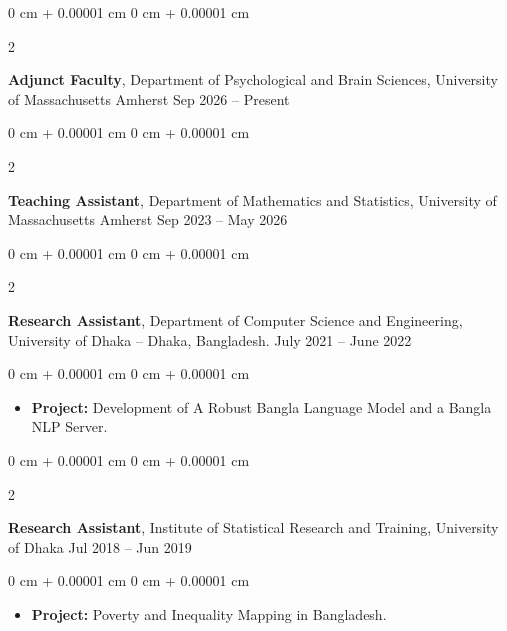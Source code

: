 \documentclass[10pt, letterpaper]{article}
\newenvironment{highlights}{
    \begin{itemize}[
        topsep=0.10 cm,
        parsep=0.10 cm,
        partopsep=0pt,
        itemsep=0pt,
        leftmargin=0 cm + 10pt
    ]
}{
    \end{itemize}
} %
\newenvironment{onecolentry}{
    \begin{adjustwidth}{
        0 cm + 0.00001 cm
    }{
        0 cm + 0.00001 cm
    }
}{
    \end{adjustwidth}
} %
\newenvironment{twocolentry}[2][]{
    \onecolentry
    \def\secondColumn{#2}
    \setcolumnwidth{\fill, 4.5 cm}
    \begin{paracol}{2}
}{
    \switchcolumn \raggedleft \secondColumn
    \end{paracol}
    \endonecolentry
} %
\begin{document}
    \vspace{0.25 cm}
    \begin{twocolentry}{
            Sep 2026 – Present
        }
            \textbf{Adjunct Faculty}, Department of Psychological and Brain Sciences, University of Massachusetts Amherst \end{twocolentry}

    \vspace{0.25 cm}
    \begin{twocolentry}{
            Sep 2023 – May 2026
        }
            \textbf{Teaching Assistant}, Department of Mathematics and Statistics, University of Massachusetts Amherst \end{twocolentry}

    \vspace{0.25 cm}
    \begin{twocolentry}{
            July 2021 -- June 2022
        }
            \textbf{Research Assistant}, Department of Computer Science and Engineering, University of Dhaka -- Dhaka, Bangladesh.\end{twocolentry}

        \vspace{0.10 cm}
        \begin{onecolentry}
            \begin{highlights}
                \item \textbf{Project:} Development of A Robust Bangla Language Model and a Bangla NLP Server.
            \end{highlights}
        \end{onecolentry}

    \vspace{0.25 cm}
    \begin{twocolentry}{
            Jul 2018 – Jun 2019
        }
            \textbf{Research Assistant}, Institute of Statistical Research and Training, University of Dhaka \end{twocolentry}

        \vspace{0.10 cm}
        \begin{onecolentry}
            \begin{highlights}
                \item \textbf{Project:} Poverty and Inequality Mapping in Bangladesh.
            \end{highlights}
        \end{onecolentry}

    \vspace{0.25 cm}
\end{document}
